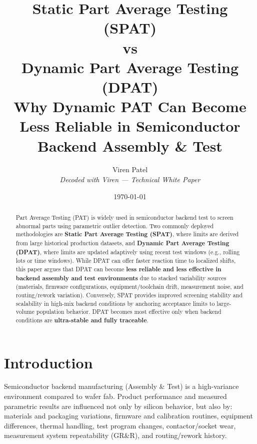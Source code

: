 \documentclass[11pt,a4paper]{article}
\title{\textbf{Static Part Average Testing (SPAT) \\ vs \\Dynamic Part Average Testing (DPAT)}\\
	\large Why Dynamic PAT Can Become Less Reliable in Semiconductor Backend Assembly \& Test}
\author{Viren Patel\\
	\small \textit{Decoded with Viren — Technical White Paper}}
\date{\today}
\begin{document}
	\maketitle
	
	\vspace{-0.5em}
	
	\begin{center}
	\end{center}
	
	\vspace{1em}
	
	\begin{abstract}
		Part Average Testing (PAT) is widely used in semiconductor backend test to screen abnormal parts using
		parametric outlier detection. Two commonly deployed methodologies are \textbf{Static Part Average Testing (SPAT)},
		where limits are derived from large historical production datasets, and \textbf{Dynamic Part Average Testing (DPAT)},
		where limits are updated adaptively using recent test windows (e.g., rolling lots or time windows).
		While DPAT can offer faster reaction time to localized shifts, this paper argues that DPAT can become
		\textbf{less reliable and less effective in backend assembly and test environments} due to stacked variability sources
		(materials, firmware configurations, equipment/toolchain drift, measurement noise, and routing/rework variation).
		Conversely, SPAT provides improved screening stability and scalability in high-mix backend conditions by
		anchoring acceptance limits to large-volume population behavior. DPAT becomes most effective only when backend
		conditions are \textbf{ultra-stable and fully traceable}.
	\end{abstract}
	
	\tableofcontents
	\newpage
	
	\section{Introduction}
	Semiconductor backend manufacturing (Assembly \& Test) is a high-variance environment compared to wafer fab.
	Product performance and measured parametric results are influenced not only by silicon behavior, but also by:
	materials and packaging variations, firmware and calibration routines, equipment differences, thermal handling,
	test program changes, contactor/socket wear, measurement system repeatability (GR\&R), and routing/rework history.
	
\end{document}
